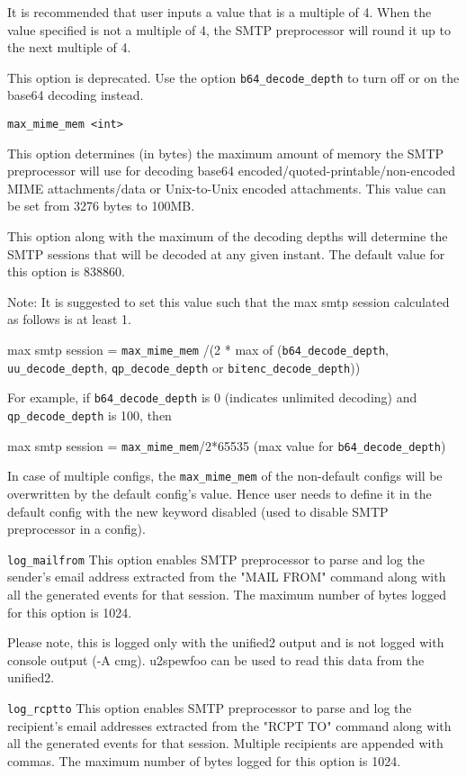 \documentclass[english]{report}
\newcounter{slistnum}
\newenvironment{slist}
{ \begin{list}{ {\bf \arabic{slistnum}.} }{\usecounter{slistnum} } }
{ \end{list} }
\begin{document}
\begin{slist}
It is recommended that user inputs a value that is a multiple of 4. When the value 
specified is not a multiple of 4, the SMTP preprocessor will round it up to the next 
multiple of 4.

This option is deprecated. Use the option \texttt{b64\_decode\_depth} to turn off
or on the base64 decoding instead.

\item \texttt{max\_mime\_mem <int>}

This option determines (in bytes) the maximum amount of memory the SMTP preprocessor
will use for decoding base64 encoded/quoted-printable/non-encoded MIME attachments/data
or Unix-to-Unix encoded attachments. This value can be set from 3276 bytes to 100MB.

This option along with the maximum of the decoding depths will determine the SMTP
sessions that will be decoded at any given instant. The default value for this option
is 838860.

Note: It is suggested to set this value such that the max smtp session calculated as
follows is at least 1.

max smtp session = \texttt{max\_mime\_mem} /(2 * max of (\texttt{b64\_decode\_depth}, 
					\texttt{uu\_decode\_depth}, \texttt{qp\_decode\_depth}
                                        or \texttt{bitenc\_decode\_depth}))

For example, if \texttt{b64\_decode\_depth} is 0 (indicates unlimited decoding) and 
\texttt{qp\_decode\_depth} is 100, then

max smtp session = \texttt{max\_mime\_mem}/2*65535 (max value for \texttt{b64\_decode\_depth})

In case of multiple configs, the \texttt{max\_mime\_mem} of the non-default configs will be overwritten by the
default config's value. Hence user needs to define it in the default config with the new keyword
disabled (used to disable SMTP preprocessor in a config).

\item \texttt{log\_mailfrom}
This option enables SMTP preprocessor to parse and log the sender's email address extracted 
from the "MAIL FROM" command along with all the generated events for that session. The maximum
number of bytes logged for this option is 1024.

Please note, this is logged only with the unified2 output and is not logged with console output (-A cmg).
u2spewfoo can be used to read this data from the unified2.

\item \texttt{log\_rcptto}
This option enables SMTP preprocessor to parse and log the recipient's email addresses 
extracted from the "RCPT TO" command along with all the generated events for that session. 
Multiple recipients are appended with commas. The maximum number of bytes logged for this option is 1024.


\end{slist}
\end{document}

